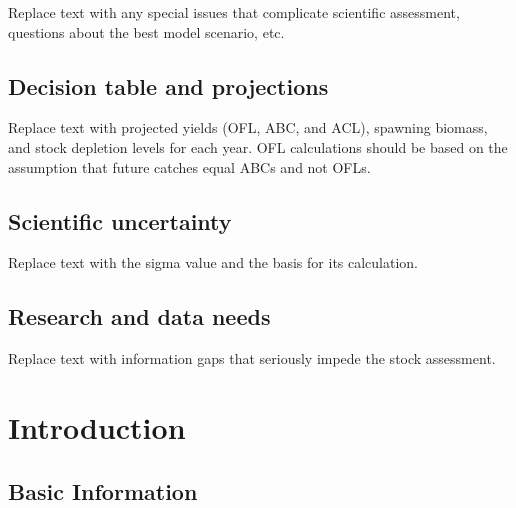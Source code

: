 \documentclass[11pt,
  english,
  letterpaper,
]{article}
\begin{document}
Replace text with any special issues that complicate scientific assessment, questions about the best model scenario, etc.

\hypertarget{decision-table-and-projections}{%
\subsection*{Decision table and projections}\label{decision-table-and-projections}}

Replace text with projected yields (OFL, ABC, and ACL), spawning biomass, and stock depletion levels for each year. OFL calculations should be based on the assumption that future catches equal ABCs and not OFLs.

\hypertarget{scientific-uncertainty}{%
\subsection*{Scientific uncertainty}\label{scientific-uncertainty}}

Replace text with the sigma value and the basis for its calculation.

\hypertarget{research-and-data-needs}{%
\subsection*{Research and data needs}\label{research-and-data-needs}}

Replace text with information gaps that seriously impede the stock assessment.

\pagebreak
\setlength{\parskip}{5mm plus1mm minus1mm}
\setcounter{page}{1}
\renewcommand{\thefigure}{\arabic{figure}}
\renewcommand{\thetable}{\arabic{table}}
\setcounter{table}{0}
\setcounter{figure}{0}

\hypertarget{introduction}{%
\section{Introduction}\label{introduction}}

\hypertarget{basic-information}{%
\subsection{Basic Information}\label{basic-information}}
\end{document}
